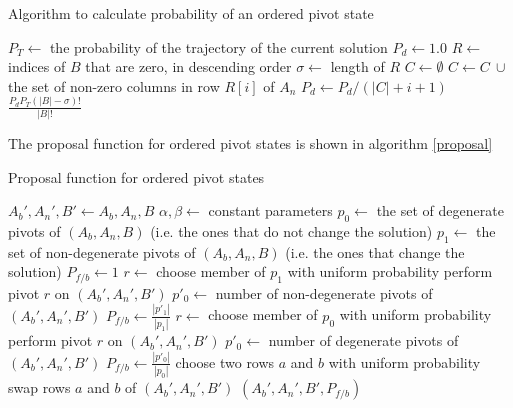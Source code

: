 \documentclass{article}
\begin{document}
\begin{algorithm}
\caption{Algorithm to calculate probability of an ordered pivot state}
\label{probAlgorithm}
\begin{algorithmic}
 
\State $P_T \leftarrow$ the probability of the trajectory of the current solution
\State $P_d \leftarrow 1.0$
\State $R \leftarrow$ indices of $B$ that are zero, in descending order
\State $\sigma \leftarrow$ length of $R$
\State $C \leftarrow \emptyset$
	\State $C \leftarrow C \ \cup $ the set of non-zero columns in row $R[i]$ of $A_n$
	\State $P_d \leftarrow P_d/(|C|+i+1)$
\EndFor
\State \Return $\frac{P_d P_T(|B|-\sigma)!}{|B|!}$
\EndFunction
\end{algorithmic}
\end{algorithm}

The proposal function for ordered pivot states is shown in algorithm \ref{proposal}

\begin{algorithm}
\caption{Proposal function for ordered pivot states}
\label{proposal}
\begin{algorithmic}
 
\State $A_b',A_n',B' \leftarrow A_b,A_n,B$
\State $\alpha, \beta \leftarrow$ constant parameters
\State $p_0 \leftarrow$ the set of degenerate pivots of $(A_b,A_n,B)$ (i.e. the ones that do not change the solution)
\State $p_1 \leftarrow$ the set of non-degenerate pivots of $(A_b,A_n,B)$ (i.e. the ones that change the solution)
\State $P_{f/b} \leftarrow 1$ 
  \State $r \leftarrow$ choose member of $p_1$ with uniform probability
  \State perform pivot $r$ on $(A_b',A_n',B')$
  \State $p'_0 \leftarrow $ number of non-degenerate pivots of $(A_b',A_n',B')$
  \State $P_{f/b} \leftarrow \frac{|p'_1|}{|p_1|}$
  \State $r \leftarrow$ choose member of $p_0$ with uniform probability
  \State perform pivot $r$ on $(A_b',A_n',B')$
  \State $p'_0 \leftarrow $ number of degenerate pivots of $(A_b',A_n',B')$
  \State $P_{f/b} \leftarrow \frac{|p'_0|}{|p_0|}$
\Else
  \State choose two rows $a$ and $b$ with uniform probability
  \State swap rows $a$ and $b$ of $(A_b',A_n',B')$
\EndIf
\State \Return $(A_b',A_n',B',P_{f/b})$
\EndFunction
\end{algorithmic}
\end{algorithm}
\end{document}
